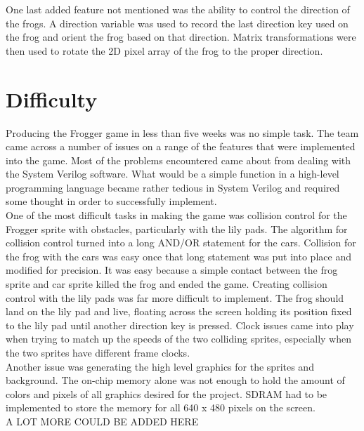 \documentclass[journal, twocolumn, final,11pt,letterpaper]{IEEEtran}
\begin{document}
One last added feature not mentioned was the ability to control the direction of the frogs.  A direction variable was used to record the last direction key used on the frog and orient the frog based on that direction.  Matrix transformations were then used to rotate the 2D pixel array of the frog to the proper direction.  \\  	
	
\section{ Difficulty}
Producing the Frogger game in less than five weeks was no simple task.  The team came across a number of issues on a range of the features that were implemented into the game.  Most of the problems encountered came about from dealing with the System Verilog software.  What would be a simple function in a high-level programming language became rather tedious in System Verilog and required some thought in order to successfully implement.  \\

One of the most difficult tasks in making the game was collision control for the Frogger sprite with obstacles, particularly with the lily pads.  The algorithm for collision control turned into a long AND/OR statement for the cars.  Collision for the frog with the cars was easy once that long statement was put into place and modified for precision.  It was easy because a simple contact between the frog sprite and car sprite killed the frog and ended the game.  Creating collision control with the lily pads was far more difficult to implement.  The frog should land on the lily pad and live, floating across the screen holding its position fixed to the lily pad until another direction key is pressed.  Clock issues came into play when trying to match up the speeds of the two colliding sprites, especially when the two sprites have different frame clocks.  \\

Another issue was generating the high level graphics for the sprites and background.  The on-chip memory alone was not enough to hold the amount of colors and pixels of all graphics desired for the project.  SDRAM had to be implemented to store the memory for all 640 x 480 pixels on the screen. \\

A LOT MORE COULD BE ADDED HERE\\
\end{document}
